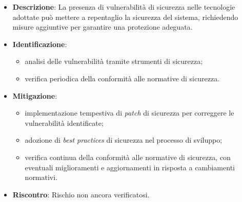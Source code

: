 \label{risk:problemi di sicurezza delle tecnologie utilizzate}
\begin{itemize}
	\item \textbf{Descrizione}: La presenza di vulnerabilità di sicurezza nelle tecnologie 
								adottate può mettere a repentaglio la sicurezza del sistema, 
								richiedendo misure aggiuntive per garantire una protezione adeguata.
	\item \textbf{Identificazione}:
	      \begin{itemize}
		      \item analisi delle vulnerabilità tramite strumenti di sicurezza;
		      
			  \item verifica periodica della conformità alle normative di sicurezza.
	      \end{itemize}

	\item \textbf{Mitigazione}:
	      \begin{itemize}
		      \item implementazione tempestiva di \textit{patch} di sicurezza per correggere le vulnerabilità identificate;

		      \item adozione di \textit{best practices} di sicurezza nel processo di sviluppo;
		      
			  \item verifica continua della conformità alle normative di sicurezza, con 
			  		eventuali miglioramenti e aggiornamenti in risposta a cambiamenti normativi.
	      \end{itemize}
	\item \textbf{Riscontro}: Rischio non ancora verificatosi.
\end{itemize}
